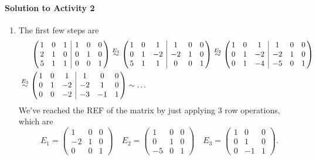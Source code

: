 \paragraph{Solution to Activity 2}
\begin{enumerate}
	\item The first few steps are
		\begin{equation*} 
			\begin{split}
				\small
				&\hphantom{{}\overset{\tiny E_{3}}{\sim}{}}
				\left(\!\!\begin{array}{ccc|ccc}1 & 0 & 1 & 1 & 0 & 0\\ 2 & 1 & 0 & 0 & 1 & 0\\ 5 & 1 & 1 & 0 & 0 & 1\end{array}\!\!\right) 
				\overset{\tiny E_{1}}{\sim}
				\left(\!\!\begin{array}{ccc|ccc}1 & 0 & 1 & 1 & 0 & 0\\ 0 & 1 & -2 & -2 & 1 & 0\\ 5 & 1 & 1 & 0 & 0 & 1\end{array}\!\!\right)
				\overset{\tiny E_{2}}{\sim}
				\left(\!\!\begin{array}{ccc|ccc}1 & 0 & 1 & 1 & 0 & 0\\ 0 & 1 & -2 & -2 & 1 & 0\\ 0 & 1 & -4 & -5 & 0 & 1\end{array}\!\!\right) \\
				&\overset{\tiny E_{3}}{\sim}
				\left(\!\!\begin{array}{ccc|ccc}1 & 0 & 1 & 1 & 0 & 0\\ 0 & 1 & -2 & -2 & 1 & 0\\ 0 & 0 & -2 & -3 & -1 & 1\end{array}\!\!\right) \sim \dots
			\end{split}
		\end{equation*}
		We've reached the REF of the matrix by just applying 3 row operations, which are 
		\[E_1 = \begin{pmatrix}1 & 0 & 0 \\ -2 & 1 & 0 \\ 0 & 0 & 1\end{pmatrix} \quad E_2 = \begin{pmatrix}1 & 0 & 0 \\ 0 & 1 & 0 \\ -5 & 0 & 1\end{pmatrix}
		\quad E_3 = \begin{pmatrix}1 & 0 & 0 \\ 0 & 1 & 0 \\ 0 & -1 & 1 \end{pmatrix}.\]

\end{enumerate}
